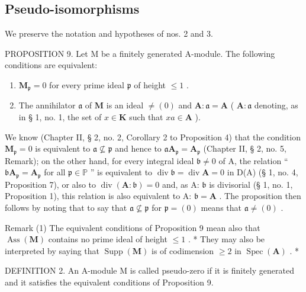 \subsection{Pseudo-isomorphisms}

We preserve the notation and hypotheses of nos. 2 and 3.

PROPOSITION 9. Let M be a finitely generated A-module. The following conditions are equivalent:

\begin{enumerate}
\def\labelenumi{(\alph{enumi})}
\item
  \(\mathbf{M}_{\mathfrak{p}} = 0\) for every prime ideal \(\mathfrak{p}\) of height \(\leqslant 1\) .
\item
  The annihilator \(\mathfrak{a}\) of \(\mathbf{M}\) is an ideal \(\neq (0)\) and \(\mathbf{A}:\mathfrak{a} = \mathbf{A}\) ( \(\mathbf{A}:\mathfrak{a}\) denoting, as in § 1, no. 1, the set of \(x\in \mathbf{K}\) such that \(xa\in \mathbf{A}\) ).
\end{enumerate}

We know (Chapter II, § 2, no. 2, Corollary 2 to Proposition 4) that the condition \(\mathbf{M}_{\mathfrak{p}} = 0\) is equivalent to \(\mathfrak{a} \nsubseteq \mathfrak{p}\) and hence to \(\mathfrak{a}\mathbf{A}_{\mathfrak{p}} = \mathbf{A}_{\mathfrak{p}}\) (Chapter II, § 2, no. 5, Remark); on the other hand, for every integral ideal \(\mathfrak{b} \neq 0\) of A, the relation `` \(\mathfrak{b}\mathbf{A}_{\mathfrak{p}} = \mathbf{A}_{\mathfrak{p}}\) for all \(\mathfrak{p} \in \mathbb{P}\) '' is equivalent to \(\operatorname{div} \mathfrak{b} = \operatorname{div} \mathbf{A} = 0\) in D(A) (§ 1, no. 4, Proposition 7), or also to \(\operatorname{div}(\mathbf{A}: \mathfrak{b}) = 0\) and, as A: \(\mathfrak{b}\) is divisorial (§ 1, no. 1, Proposition 1), this relation is also equivalent to A: \(\mathfrak{b} = \mathbf{A}\) . The proposition then follows by noting that to say that \(\mathfrak{a} \nsubseteq \mathfrak{p}\) for \(\mathfrak{p} = (0)\) means that \(\mathfrak{a} \neq (0)\) .

Remark (1) The equivalent conditions of Proposition 9 mean also that \(\operatorname{Ass}(\mathbf{M})\) contains no prime ideal of height \(\leqslant 1\) . * They may also be interpreted by saying that \(\operatorname{Supp}(\mathbf{M})\) is of codimension \(\geqslant 2\) in \(\operatorname{Spec}(\mathbf{A})\) . *

DEFINITION 2. An A-module M is called pseudo-zero if it is finitely generated and it satisfies the equivalent conditions of Proposition 9.

